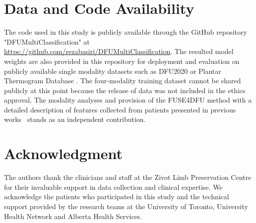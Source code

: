 \documentclass[journal,twoside,web]{ieeecolor}
\begin{document}
\section*{Data and Code Availability}
The code used in this study is publicly available through the GitHub repository "DFUMultiClassification" at \url{https://github.com/rezabasiri/DFUMultiClassification}. The resulted model weights are also provided in this repository for deployment and evaluation on publicly available single modality datasets such as DFU2020 \cite{yap2021deep} or Plantar Thermogram Database \cite{hernandez2019plantar}. The four-modality training dataset cannot be shared publicly at this point because the release of data was not included in the ethics approval. The modality analyses and provision of the FUSE4DFU method with a detailed description of features collected from patients presented in previous works~\cite{basiri2024accessible,basiri2024protocol} stands as an independent contribution.

\section*{Acknowledgment}
The authors thank the clinicians and staff at the Zivot Limb Preservation Centre for their invaluable support in data collection and clinical expertise. We acknowledge the patients who participated in this study and the technical support provided by the research teams at the University of Toronto, University Health Network and Alberta Health Services.
\end{document}
